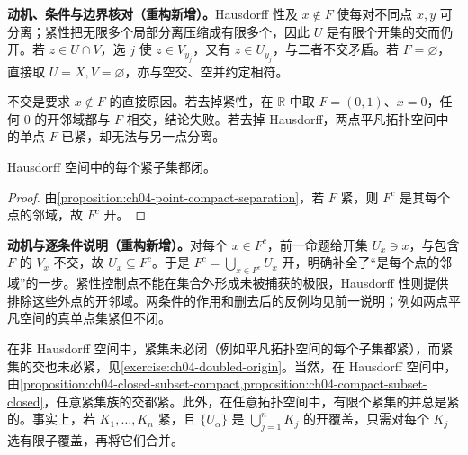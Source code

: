 \documentclass[../../main.tex]{subfiles}%
\begin{document}
\begin{remark}
\textbf{动机、条件与边界核对（重构新增）。}Hausdorff 性及 $x\notin F$ 使每对不同点 $x,y$ 可分离；紧性把无限多个局部分离压缩成有限多个，因此 $U$ 是有限个开集的交而仍开。若 $z\in U\cap V$，选 $j$ 使 $z\in V_{y_j}$，又有 $z\in U_{y_j}$，与二者不交矛盾。若 $F=\varnothing$，直接取 $U=X,V=\varnothing$，亦与空交、空并约定相符。

不交是要求 $x\notin F$ 的直接原因。若去掉紧性，在 $\mathbb R$ 中取 $F=(0,1)$、$x=0$，任何 $0$ 的开邻域都与 $F$ 相交，结论失败。若去掉 Hausdorff，两点平凡拓扑空间中的单点 $F$ 已紧，却无法与另一点分离。
\end{remark}
\begin{proposition}\label{proposition:ch04-compact-subset-closed}
Hausdorff 空间中的每个紧子集都闭。
\end{proposition}
\begin{proof}
由\cref{proposition:ch04-point-compact-separation}，若 $F$ 紧，则 $F^c$ 是其每个点的邻域，故 $F^c$ 开。
\end{proof}
\begin{remark}
\textbf{动机与逐条件说明（重构新增）。}对每个 $x\in F^c$，前一命题给开集 $U_x\ni x$，与包含 $F$ 的 $V_x$ 不交，故 $U_x\subseteq F^c$。于是 $F^c=\bigcup_{x\in F^c}U_x$ 开，明确补全了“是每个点的邻域”的一步。紧性控制点不能在集合外形成未被捕获的极限，Hausdorff 性则提供排除这些外点的开邻域。两条件的作用和删去后的反例均见前一说明；例如两点平凡空间的真单点集紧但不闭。
\end{remark}
\begin{remark}
在非 Hausdorff 空间中，紧集未必闭（例如平凡拓扑空间的每个子集都紧），而紧集的交也未必紧，见\cref{exercise:ch04-doubled-origin}。当然，在 Hausdorff 空间中，由\cref{proposition:ch04-closed-subset-compact,proposition:ch04-compact-subset-closed}，任意紧集族的交都紧。此外，在任意拓扑空间中，有限个紧集的并总是紧的。事实上，若 $K_1,\ldots,K_n$ 紧，且 $\{U_\alpha\}$ 是 $\bigcup_{j=1}^nK_j$ 的开覆盖，只需对每个 $K_j$ 选有限子覆盖，再将它们合并。
\end{remark}
\end{document}
